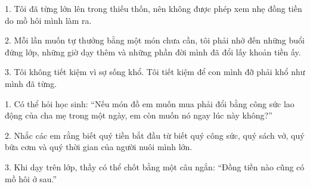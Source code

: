 \begin{turanminh}
1. Tôi đã từng lớn lên trong thiếu thốn, nên không được phép xem nhẹ đồng tiền do mồ hôi mình làm ra.

2. Mỗi lần muốn tự thưởng bằng một món chưa cần, tôi phải nhớ đến những buổi đứng lớp, những giờ dạy thêm và những phần đời mình đã đổi lấy khoản tiền ấy.

3. Tôi không tiết kiệm vì sợ sống khổ. Tôi tiết kiệm để con mình đỡ phải khổ như mình đã từng.
\end{turanminh}

\begin{dayhoc}
1. Có thể hỏi học sinh: ``Nếu món đồ em muốn mua phải đổi bằng công sức lao động của cha mẹ trong một ngày, em còn muốn nó ngay lúc này không?''

2. Nhắc các em rằng biết quý tiền bắt đầu từ biết quý công sức, quý sách vở, quý bữa cơm và quý thời gian của người nuôi mình lớn.

3. Khi dạy trên lớp, thầy có thể chốt bằng một câu ngắn: ``Đồng tiền nào cũng có mồ hôi ở sau.''
\end{dayhoc}